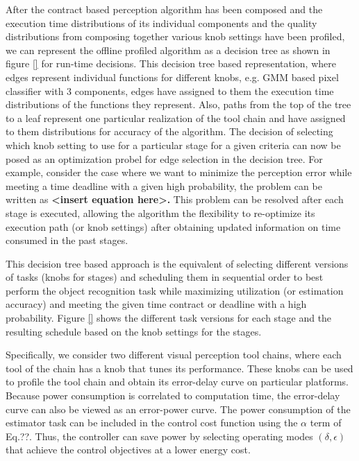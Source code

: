 After the contract based perception algorithm has been composed and the execution time distributions of its individual components and the quality distributions from composing together various knob settings have been profiled, we can represent the offline profiled algorithm as a decision tree as shown in figure \ref{} for run-time decisions. This decision tree based representation, where edges represent individual functions for different knobs, e.g. GMM based pixel classifier with 3 components, edges have assigned to them the execution time distributions of the functions they represent. Also, paths from the top of the tree to a leaf represent one particular realization of the tool chain and have assigned to them distributions for accuracy of the algorithm. The decision of selecting which knob setting to use for a particular stage for a given criteria can now be posed as an optimization probel for edge selection in the decision tree. For example, consider the case where we want to minimize the perception error while meeting a time deadline with a given high probability, the problem can be written as \textbf{<insert equation here>.} This problem can be resolved after each stage is executed, allowing the algorithm the flexibility to re-optimize its execution path (or knob settings) after obtaining updated information on time consumed in the past stages.

This decision tree based approach is the equivalent of selecting different versions of tasks (knobs for stages) and scheduling them in sequential order to best perform the object recognition task while maximizing utilization (or estimation accuracy) and meeting the given time contract or deadline with a high probability. Figure \ref{} shows the different task versions for each stage and the resulting schedule based on the knob settings for the stages.




Specifically, we consider two different visual perception tool chains, where each tool of the chain has a knob that tunes its performance.
These knobs can be used to profile the tool chain and obtain its error-delay curve on particular platforms.
Because power consumption is correlated to computation time, the error-delay curve can also be viewed as an error-power curve.
The power consumption of the estimator task can be included in the control cost function using the $\alpha$ term of Eq.??.
Thus, the controller can save power by selecting operating modes $(\delta,\epsilon)$ that achieve the control objectives at a lower energy cost.




